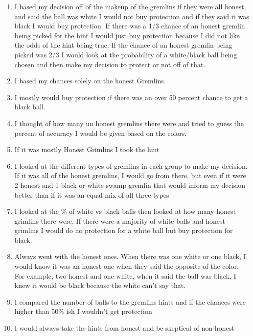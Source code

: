 \documentclass[12pt,a4paper]{article}
\begin{document}
\begin{enumerate}
\item I based my decision off of the makeup of the gremlins if they were all honest and said the ball was white I would not buy protection and if they said it was black I would buy protection. If there was a 1/3 chance of an honest gremlin being picked for the hint I would just buy protection because I did not like the odds of the hint being true. If the chance of an honest gremlin being picked was 2/3 I would look at the probability of a white/black ball being chosen and then make my decision to protect or not off of that.

\item I based my chances solely on the honest Gremlins.

\item I mostly would buy protection if there was an over 50 percent chance to get a black ball.

\item I thought of how many un honest gremlins there were and tried to guess the percent of accuracy I would be given based on the colors.

\item If it was mostly Honest Grimlins I took the hint

\item I looked at the different types of gremlins in each group to make my decision. If it was all of the honest gremlins, I would go from there, but even if it were 2 honest and 1 black or white swamp gremlin that would inform my decision better than if it was an equal mix of all three types

\item I looked at the \% of white vs black balls then looked at how many honest grimlins there were. If there were a majority of white balls and honest grimlins I would do no protection for a white ball but buy protection for black.

\item Always went with the honest ones. When there was one white or one black, I would know it was an honest one when they said the opposite of the color. For example, two honest and one white, when it said the ball was black, I knew it would be black because the white can't say that.

\item I compared the number of balls to the gremlins hints and if the chances were higher than 50\% ish I wouldn't get protection

\item I would always take the hints from honest and be skeptical of non-honest


\end{enumerate}
\end{document}
